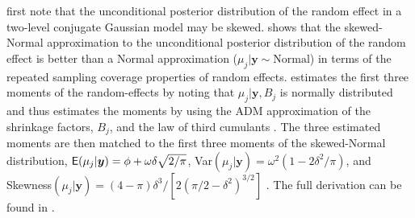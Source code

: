 \documentclass[article]{jss}
\begin{document}
\cite{morris2012} first note that the unconditional posterior distribution of
the random effect in a two-level conjugate Gaussian model may be
skewed. \cite{kelly2014advances}  shows that the skewed-Normal approximation to
the unconditional posterior distribution of the random effect is better than a
Normal approximation ($\mu_j\vert\boldsymbol{y}\sim \textrm{Normal}$) in terms
of the repeated sampling coverage properties of random
effects. \cite{kelly2014advances} estimates the first three moments of
the random-effects by noting that $\mu_j | \mathbf{y}, B_{j}$ is normally
distributed and thus estimates the moments by using the ADM approximation of
the shrinkage factors, $B_{j}$, and the law of third cumulants \cite{brill}. The
three estimated moments are then matched to the first three moments of the
skewed-Normal distribution, $\mathsf{E}(\mu_j\vert \boldsymbol{y})
=\phi+\omega\delta\sqrt{2/\pi}$, Var$(\mu_j\vert
\boldsymbol{y})=\omega^2(1-2\delta^2/\pi)$, and Skewness$(\mu_j\vert
\boldsymbol{y})=(4-\pi)\delta^3/[2(\pi/2-\delta^2)^{3/2}]$
\cite{azzalini1985class}. The full derivation can be found in \cite{kelly2014advances}. 
\end{document}
